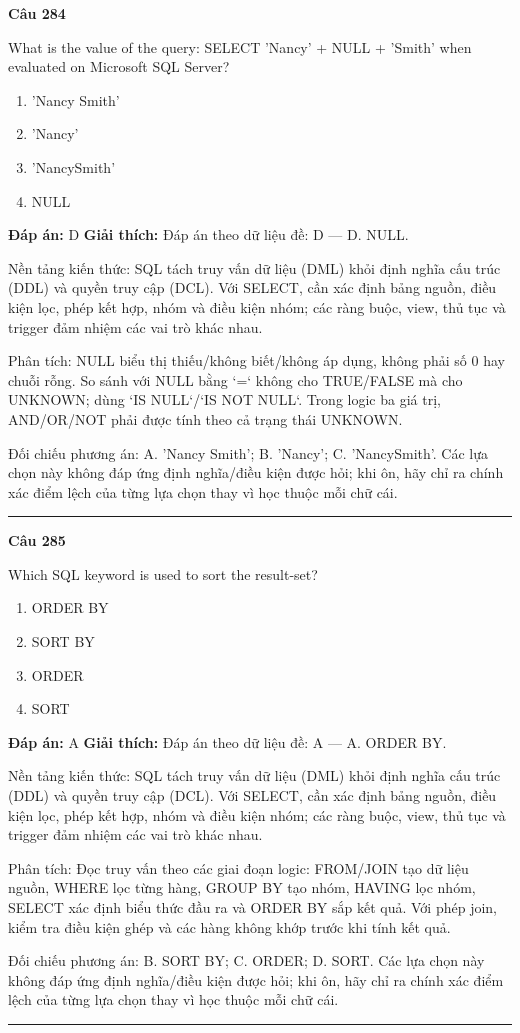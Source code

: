 \documentclass[11pt,a4paper]{article}
\newenvironment{question}[1]{%
  \par\vspace{1em}\noindent\textbf{\large Câu #1}\par\vspace{0.4em}
}{%
  \par\vspace{1em}\hrule\vspace{0.6em}
}
\newenvironment{choices}{%
  \begin{enumerate}[label=\textbf{\Alph*.},leftmargin=2.2em,itemsep=2pt,topsep=3pt]
}{%
  \end{enumerate}
}
\newcommand{\choice}{\item}
\begin{document}
\begin{question}{284}
What is the value of the query:
SELECT 'Nancy' + NULL + 'Smith'
when evaluated on Microsoft SQL Server?
\begin{choices}
\choice 'Nancy Smith'
\choice 'Nancy'
\choice 'NancySmith'
\choice NULL
\end{choices}
\textbf{Đáp án:} D
\textbf{Giải thích:} Đáp án theo dữ liệu đề: D — D. NULL.

Nền tảng kiến thức: SQL tách truy vấn dữ liệu (DML) khỏi định nghĩa cấu trúc (DDL) và quyền truy cập (DCL). Với SELECT, cần xác định bảng nguồn, điều kiện lọc, phép kết hợp, nhóm và điều kiện nhóm; các ràng buộc, view, thủ tục và trigger đảm nhiệm các vai trò khác nhau.

Phân tích: NULL biểu thị thiếu/không biết/không áp dụng, không phải số 0 hay chuỗi rỗng. So sánh với NULL bằng `=` không cho TRUE/FALSE mà cho UNKNOWN; dùng `IS NULL`/`IS NOT NULL`. Trong logic ba giá trị, AND/OR/NOT phải được tính theo cả trạng thái UNKNOWN.

Đối chiếu phương án: A. 'Nancy Smith'; B. 'Nancy'; C. 'NancySmith'. Các lựa chọn này không đáp ứng định nghĩa/điều kiện được hỏi; khi ôn, hãy chỉ ra chính xác điểm lệch của từng lựa chọn thay vì học thuộc mỗi chữ cái.
\end{question}

\begin{question}{285}
Which SQL keyword is used to sort the result-set?
\begin{choices}
\choice ORDER BY
\choice SORT BY
\choice ORDER
\choice SORT
\end{choices}
\textbf{Đáp án:} A
\textbf{Giải thích:} Đáp án theo dữ liệu đề: A — A. ORDER BY.

Nền tảng kiến thức: SQL tách truy vấn dữ liệu (DML) khỏi định nghĩa cấu trúc (DDL) và quyền truy cập (DCL). Với SELECT, cần xác định bảng nguồn, điều kiện lọc, phép kết hợp, nhóm và điều kiện nhóm; các ràng buộc, view, thủ tục và trigger đảm nhiệm các vai trò khác nhau.

Phân tích: Đọc truy vấn theo các giai đoạn logic: FROM/JOIN tạo dữ liệu nguồn, WHERE lọc từng hàng, GROUP BY tạo nhóm, HAVING lọc nhóm, SELECT xác định biểu thức đầu ra và ORDER BY sắp kết quả. Với phép join, kiểm tra điều kiện ghép và các hàng không khớp trước khi tính kết quả.

Đối chiếu phương án: B. SORT BY; C. ORDER; D. SORT. Các lựa chọn này không đáp ứng định nghĩa/điều kiện được hỏi; khi ôn, hãy chỉ ra chính xác điểm lệch của từng lựa chọn thay vì học thuộc mỗi chữ cái.
\end{question}
\end{document}
